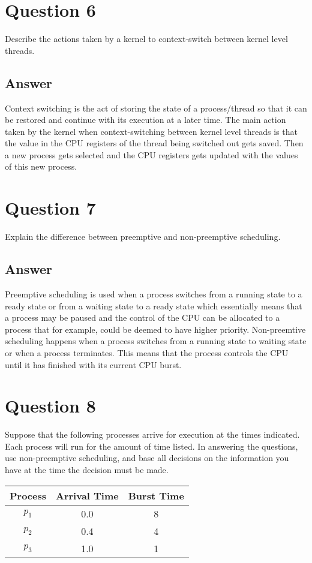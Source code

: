 \documentclass[a4paper,11pt]{article}
\begin{document}
\section{Question 6}
Describe the actions taken by a kernel to context-switch between kernel level threads.
\subsection{Answer}
Context switching is the act of storing the state of a process/thread so that it can be restored and continue with its execution at a later time. The main action taken by the kernel when context-switching between kernel level threads is that the value in the CPU registers of the thread being switched out gets saved. Then a new process gets selected and the CPU registers gets updated with the values of this new process.



\section{Question 7}
Explain the difference between preemptive and non-preemptive scheduling.
\subsection{Answer}
Preemptive scheduling is used when a process switches from a running state to a ready state or from a waiting state to a ready state which essentially means that a process may be paused and the control of the CPU can be allocated to a process that for example, could be deemed to have higher priority.
Non-preemtive scheduling happens when a process switches from a running state to waiting state or when a process terminates. This means that the process controls the CPU until it has finished with its current CPU burst.

\pagebreak
\section{Question 8}
Suppose that the following processes arrive for execution at the times indicated. Each process will run
for the amount of time listed. In answering the questions, use non-preemptive scheduling, and base all decisions on the information you have at the time the decision must be made.
\begin{table}[h]
    \begin{center}
        \begin{tabular}{c|c|c}
            \textbf{Process} & \textbf{Arrival Time} & \textbf{Burst Time}\\
            \hline
            $p_1$   &   0.0    &   8\\
            $p_2$   &   0.4    &   4\\
            $p_3$   &   1.0    &   1\\
        \end{tabular}
        \label{tab:table1}
    \end{center}
\end{table}
\end{document}
